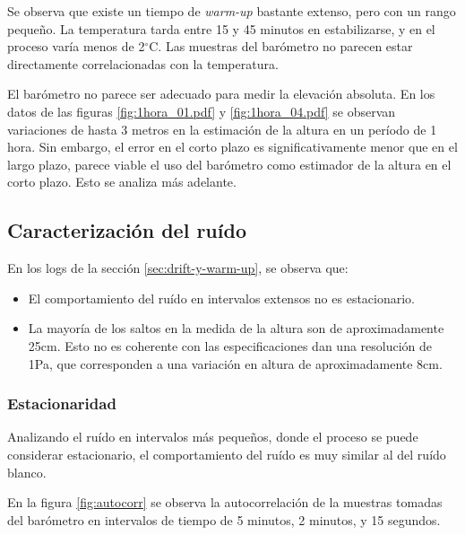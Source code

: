 \documentclass[spanish,12pt,a4paper,titlepage]{report}
\newcommand{\degc}{$^\circ$C}
\begin{document}

Se observa que existe un tiempo de \textit{warm-up} bastante extenso, pero con un rango pequeño. La temperatura tarda entre 15 y 45 minutos en estabilizarse, y en el proceso varía menos de 2\degc. Las muestras del barómetro no parecen estar directamente correlacionadas con la temperatura.

El barómetro no parece ser adecuado para medir la elevación absoluta. En los datos de las figuras \ref{fig:1hora_01.pdf} y \ref{fig:1hora_04.pdf} se observan variaciones de hasta 3 metros en la estimación de la altura en un período de 1 hora. Sin embargo, el error en el corto plazo es significativamente menor que en el largo plazo, parece viable el uso del barómetro como estimador de la altura en el corto plazo. Esto se analiza más adelante.

\newpage
\subsection{Caracterización del ruído}
\label{sec:caract-ruido}

En los logs de la sección \ref{sec:drift-y-warm-up}, se observa que:
\begin{itemize}
\item El comportamiento del ruído en intervalos extensos no es estacionario.
\item La mayoría de los saltos en la medida de la altura son de aproximadamente 25cm. Esto no es coherente con las especificaciones dan una resolución de 1Pa, que corresponden a una variación en altura de aproximadamente 8cm.
\end{itemize}

\subsubsection{Estacionaridad}

Analizando el ruído en intervalos más pequeños, donde el proceso se puede considerar estacionario, el comportamiento del ruído es muy similar al del ruído blanco.

En la figura \ref{fig:autocorr} se observa la autocorrelación de la muestras tomadas del barómetro en intervalos de tiempo de 5 minutos, 2 minutos, y 15 segundos.
\end{document}
